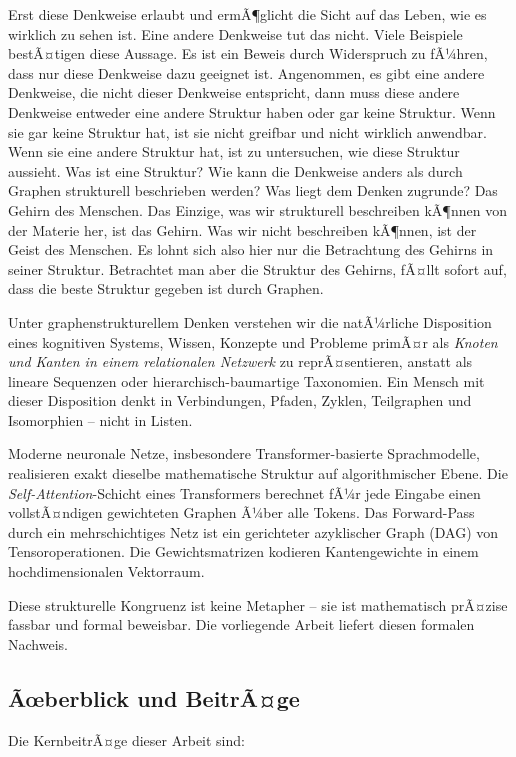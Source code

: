 ﻿\documentclass[12pt,a4paper]{article}
\theoremstyle{plain}
\theoremstyle{definition}
\theoremstyle{remark}
\begin{document}
Erst diese Denkweise erlaubt und ermÃ¶glicht die Sicht auf das Leben, wie es wirklich zu sehen ist. Eine andere Denkweise tut das nicht. Viele Beispiele bestÃ¤tigen diese Aussage. Es ist ein Beweis durch Widerspruch zu fÃ¼hren, dass nur diese Denkweise dazu geeignet ist. Angenommen, es gibt eine andere Denkweise, die nicht dieser Denkweise entspricht, dann muss diese andere Denkweise entweder eine andere Struktur haben oder gar keine Struktur. Wenn sie gar keine Struktur hat, ist sie nicht greifbar und nicht wirklich anwendbar. Wenn sie eine andere Struktur hat, ist zu untersuchen, wie diese Struktur aussieht. Was ist eine Struktur? Wie kann die Denkweise anders als durch Graphen strukturell beschrieben werden? Was liegt dem Denken zugrunde? Das Gehirn des Menschen. Das Einzige, was wir strukturell beschreiben kÃ¶nnen von der Materie her, ist das Gehirn. Was wir nicht beschreiben kÃ¶nnen, ist der Geist des Menschen. Es lohnt sich also hier nur die Betrachtung des Gehirns in seiner Struktur. Betrachtet man aber die Struktur des Gehirns, fÃ¤llt sofort auf, dass die beste Struktur gegeben ist durch Graphen.

Unter graphenstrukturellem Denken verstehen wir die natÃ¼rliche Disposition eines kognitiven Systems, Wissen, Konzepte und Probleme primÃ¤r als \emph{Knoten und Kanten in einem relationalen Netzwerk} zu reprÃ¤sentieren, anstatt als lineare Sequenzen oder hierarchisch-baumartige Taxonomien. Ein Mensch mit dieser Disposition denkt in Verbindungen, Pfaden, Zyklen, Teilgraphen und Isomorphien -- nicht in Listen.

Moderne neuronale Netze, insbesondere Transformer-basierte Sprachmodelle, realisieren exakt dieselbe mathematische Struktur auf algorithmischer Ebene. Die \emph{Self-Attention}-Schicht eines Transformers berechnet fÃ¼r jede Eingabe einen vollstÃ¤ndigen gewichteten Graphen Ã¼ber alle Tokens. Das Forward-Pass durch ein mehrschichtiges Netz ist ein gerichteter azyklischer Graph (DAG) von Tensoroperationen. Die Gewichtsmatrizen kodieren Kantengewichte in einem hochdimensionalen Vektorraum.

Diese strukturelle Kongruenz ist keine Metapher -- sie ist mathematisch prÃ¤zise fassbar und formal beweisbar. Die vorliegende Arbeit liefert diesen formalen Nachweis.

\subsection{Ãœberblick und BeitrÃ¤ge}

Die KernbeitrÃ¤ge dieser Arbeit sind:
\end{document}
